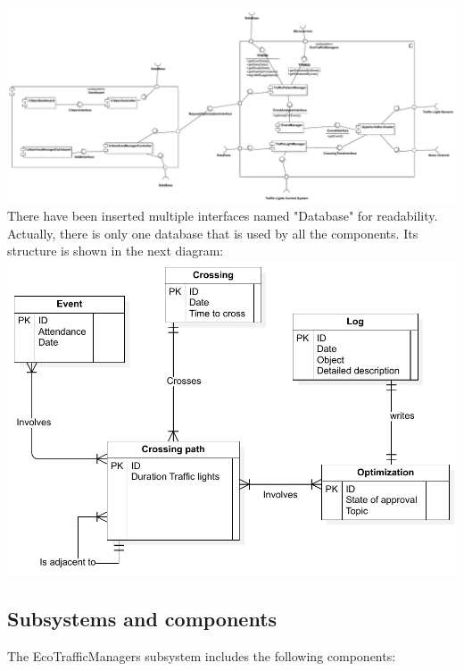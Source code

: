 \documentclass[12pt, a4paper, twoside, openright]{report}
\begin{document}
\includegraphics[width=\linewidth]{images/svg/ComponentDiagram.pdf}
There have been inserted multiple interfaces named "Database" for readability. Actually, there is only one database that is used by all the components.
Its structure is shown in the next diagram:\\
\includegraphics[width=\linewidth]{images/svg/ERDDiagram.pdf}

\subsection{Subsystems and components}

The EcoTrafficManagers subsystem includes the following components:
\end{document}
